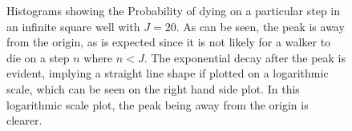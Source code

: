 \documentclass[journal]{IEEEtran}
\begin{document}
\begin{figure}%
  \centering
  \centering
  \caption{Histograms showing the Probability of dying on a particular step in
    an infinite square well with $J = 20$. As can be seen, the peak is away from the
    origin, as is expected since it is not likely for a walker to die on a step $n$
    where $n < J$. The exponential decay after the peak is evident, implying a
    straight line shape if plotted on a logarithmic scale, which can be seen on
    the right hand side plot. In this logarithmic scale plot, the peak being away
    from the origin is clearer.}
  \label{fig:expplots}
\end{figure}
\end{document}
